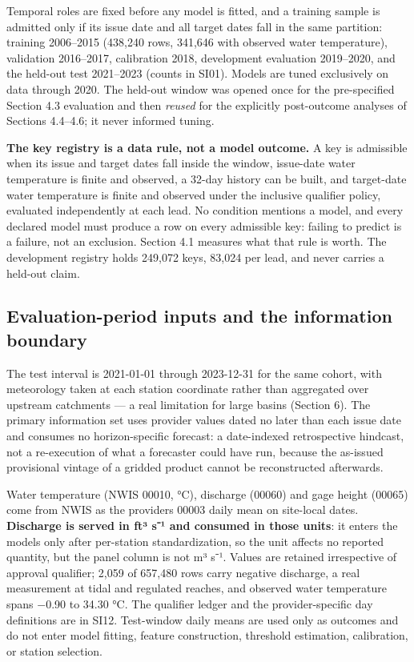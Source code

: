 Temporal roles are fixed before any model is fitted, and a training sample is
admitted only if its issue date and all target dates fall in the same partition:
training 2006--2015 (438,240 rows, 341,646 with observed water temperature),
validation 2016--2017, calibration 2018, development evaluation 2019--2020, and
the held-out test 2021--2023 (counts in SI01). Models are tuned exclusively on
data through 2020. The held-out window was opened once for the pre-specified
Section 4.3 evaluation and then \emph{reused} for the explicitly post-outcome
analyses of Sections 4.4--4.6; it never informed tuning.

\textbf{The key registry is a data rule, not a model outcome.} A key is admissible
when its issue and target dates fall inside the window, issue-date water
temperature is finite and observed, a 32-day history can be built, and
target-date water temperature is finite and observed under the inclusive
qualifier policy, evaluated independently at each lead. No condition mentions a
model, and every declared model must produce a row on every admissible key:
failing to predict is a failure, not an exclusion. Section 4.1 measures what
that rule is worth. The development registry holds 249,072 keys, 83,024 per
lead, and never carries a held-out claim.

\subsection{Evaluation-period inputs and the information boundary}\label{evaluation-period-inputs-and-the-information-boundary}

The test interval is 2021-01-01 through 2023-12-31 for the same cohort, with
meteorology taken at each station coordinate rather than aggregated over
upstream catchments --- a real limitation for large basins (Section 6). The
primary information set uses provider values dated no later than each issue date
and consumes no horizon-specific forecast: a date-indexed retrospective
hindcast, not a re-execution of what a forecaster could have run, because the
as-issued provisional vintage of a gridded product cannot be reconstructed
afterwards.

Water temperature (NWIS 00010, °C), discharge (00060) and gage height (00065)
come from NWIS as the provider\textquotesingle s 00003 daily mean on site-local dates.
\textbf{Discharge is served in ft³ s⁻¹ and consumed in those units}: it enters the
models only after per-station standardization, so the unit affects no reported
quantity, but the panel column is not m³ s⁻¹. Values are retained irrespective
of approval qualifier; 2,059 of 657,480 rows carry negative discharge, a real
measurement at tidal and regulated reaches, and observed water temperature spans
−0.90 to 34.30 °C. The qualifier ledger and the provider-specific day
definitions are in SI12. Test-window daily means are used only as outcomes and
do not enter model fitting, feature construction, threshold estimation,
calibration, or station selection.

